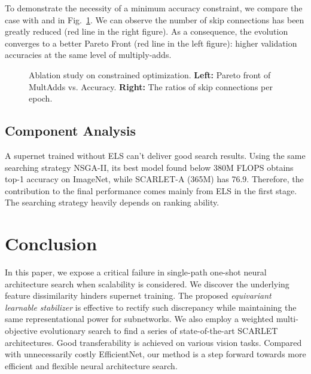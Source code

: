 \documentclass[runningheads]{llncs}
\begin{document}
To demonstrate the necessity of a minimum accuracy constraint, we compare the case with  and  in Fig.~\ref{fig:ablation-constraint}. We can observe the number of skip connections has been greatly reduced (red line in the right figure). As a consequence, the evolution converges to a better Pareto Front (red line in the left figure): higher validation accuracies at the same level of multiply-adds.

 \begin{figure}
\centering
{}
\caption{Ablation study on constrained optimization. \textbf{Left:} Pareto front of MultAdds vs. Accuracy.  \textbf{Right:} The ratios of skip connections per epoch.} \label{fig:ablation-constraint}
\end{figure}

\subsection{Component Analysis}
A supernet trained without ELS can't deliver good search results. Using the same searching strategy NSGA-II, its best model found below 380M FLOPS obtains  top-1 accuracy on ImageNet, while SCARLET-A (365M) has 76.9. Therefore, the contribution to the final performance comes mainly from ELS in the first stage. The searching strategy heavily depends on  ranking ability. 


\section{Conclusion}
In this paper, we expose a critical failure in single-path one-shot neural architecture search when scalability is considered. We discover the underlying feature dissimilarity hinders supernet training. The proposed \emph{equivariant learnable stabilizer} is effective to rectify such discrepancy while maintaining the same representational power for subnetworks. We also employ a weighted multi-objective evolutionary search to find a series of state-of-the-art SCARLET architectures. Good transferability is achieved on various vision tasks. Compared with unnecessarily costly EfficientNet, our method is a step forward towards more efficient and flexible neural architecture search. 






\clearpage
\appendix
\end{document}

